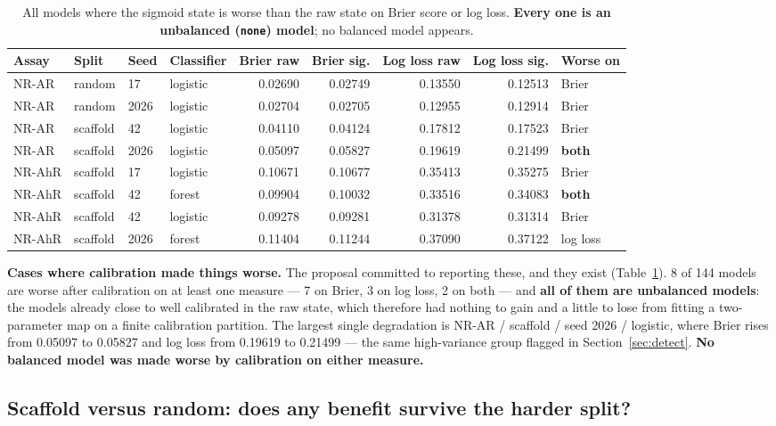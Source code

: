 \documentclass[10pt,letterpaper]{article}
\begin{document}
\begin{table}[!htbp]
\centering
\small
\caption{All models where the sigmoid state is worse than the raw state on Brier score or log loss.
\textbf{Every one is an unbalanced (\texttt{none}) model}; no balanced model appears.}
\label{tab:calworse}
\begin{tabular}{@{}llllrrrrl@{}}
\toprule
Assay & Split & Seed & Classifier & Brier raw & Brier sig. & Log loss raw & Log loss sig. & Worse on \\
\midrule
NR-AR  & random   & 17   & logistic & 0.02690 & 0.02749 & 0.13550 & 0.12513 & Brier \\
NR-AR  & random   & 2026 & logistic & 0.02704 & 0.02705 & 0.12955 & 0.12914 & Brier \\
NR-AR  & scaffold & 42   & logistic & 0.04110 & 0.04124 & 0.17812 & 0.17523 & Brier \\
NR-AR  & scaffold & 2026 & logistic & 0.05097 & 0.05827 & 0.19619 & 0.21499 & \textbf{both} \\
NR-AhR & scaffold & 17   & logistic & 0.10671 & 0.10677 & 0.35413 & 0.35275 & Brier \\
NR-AhR & scaffold & 42   & forest   & 0.09904 & 0.10032 & 0.33516 & 0.34083 & \textbf{both} \\
NR-AhR & scaffold & 42   & logistic & 0.09278 & 0.09281 & 0.31378 & 0.31314 & Brier \\
NR-AhR & scaffold & 2026 & forest   & 0.11404 & 0.11244 & 0.37090 & 0.37122 & log loss \\
\bottomrule
\end{tabular}
\end{table}

\textbf{Cases where calibration made things worse.} The proposal committed to reporting these, and
they exist (Table~\ref{tab:calworse}). 8 of 144 models are worse after calibration on at least one
measure --- 7 on Brier, 3 on log loss, 2 on both --- and \textbf{all of them are unbalanced models}:
the models already close to well calibrated in the raw state, which therefore had nothing to gain and
a little to lose from fitting a two-parameter map on a finite calibration partition. The largest
single degradation is NR-AR / scaffold / seed 2026 / logistic, where Brier rises from 0.05097 to
0.05827 and log loss from 0.19619 to 0.21499 --- the same high-variance group flagged in
Section~\ref{sec:detect}. \textbf{No balanced model was made worse by calibration on either measure.}

\subsection{Scaffold versus random: does any benefit survive the harder split?}
\label{sec:scaffvrand}
\end{document}
